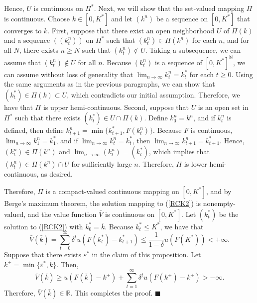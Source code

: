 \documentclass[a4paper,12pt]{article}
\theoremstyle{definition}
\begin{document}
Hence, $U$ is continuous on $\Pi^*$. Next, we will show that the set-valued mapping $\Pi$ is continuous. Choose $k\in [0,K^*]$ and let $(k^n)$ be a sequence on $[0,K^*]$ that converges to $k$. First, suppose that there exist an open neighborhood $U$ of $\Pi(k)$ and a sequence $((k_t^n))$ on $\Pi^*$ such that $(k_t^n)\in \Pi(k^n)$ for each $n$, and for all $N$, there exists $n\ge N$ such that $(k_t^n)\notin U$. Taking a subsequence, we can assume that $(k_t^n)\notin U$ for all $n$. Because $(k_t^n)$ is a sequence of $[0,K^*]^{\mathbb{N}}$, we can assume without loss of generality that $\lim_{n\to \infty}k_t^n=k_t^*$ for each $t\ge 0$. Using the same arguments as in the previous paragraphs, we can show that $(k_t^*)\in \Pi(k)\subset U$, which contradicts our initial assumption. Therefore, we have that $\Pi$ is upper hemi-continuous. Second, suppose that $U$ is an open set in $\Pi^*$ such that there exists $(k_t^*)\in U\cap \Pi(k)$. Define $k_0^n=k^n$, and if $k_t^n$ is defined, then define $k_{t+1}^n=\min\{k_{t+1}^*,F(k_t^n)\}$. Because $F$ is continuous, $\lim_{n\to\infty}k_1^n=k_1^*$, and if $\lim_{n\to \infty}k_t^n=k_t^*$, then $\lim_{n\to \infty}k_{t+1}^n=k_{t+1}^*$. Hence, $(k_t^n)\in \Pi(k^n)$ and $\lim_{n\to \infty}(k_t^n)=(k_t^*)$, which implies that $(k_t^n)\in \Pi(k^n)\cap U$ for sufficiently large $n$. Therefore, $\Pi$ is lower hemi-continuous, as desired.

Therefore, $\Pi$ is a compact-valued continuous mapping on $[0,K^*]$, and by Berge's maximum theorem, the solution mapping to (\ref{RCK2}) is nonempty-valued, and the value function $\bar{V}$ is continuous on $[0,K^*]$. Let $(k_t^*)$ be the solution to (\ref{RCK2}) with $k_0^*=\bar{k}$. Because $k_t^*\le K^*$, we have that
\[\bar{V}(\bar{k})=\sum_{t=0}^{\infty}\delta^tu(F(k_t^*)-k_{t+1}^*)\le \frac{1}{1-\delta}u(F(K^*))<+\infty.\]
Suppose that there exists $\varepsilon^*$ in the claim of this proposition. Let $k^+=\min\{\varepsilon^*,\bar{k}\}$. Then,
\[\bar{V}(\bar{k})\ge u(F(\bar{k})-k^+)+\sum_{t=1}^{\infty}\delta^tu(F(k^+)-k^+)>-\infty.\]
Therefore, $\bar{V}(\bar{k})\in \mathbb{R}$. This completes the proof. $\blacksquare$
\end{document}
